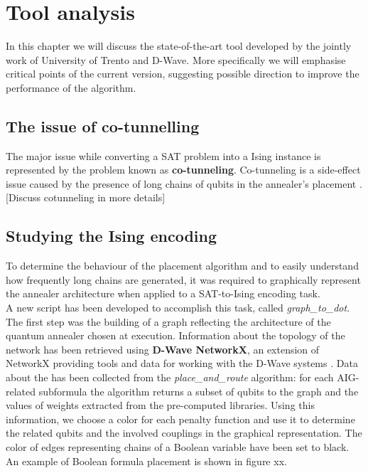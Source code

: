 \chapter{Tool analysis}
\label{cha:analysis}

In this chapter we will discuss the state-of-the-art tool developed by the jointly work of University of Trento and D-Wave. More specifically we will emphasise critical points of the current version, suggesting possible direction to improve the performance of the algorithm.

\section{The issue of co-tunnelling}

The major issue while converting a SAT problem into a Ising instance is represented by the problem known as \textbf{co-tunneling}. Co-tunneling is a side-effect issue caused by the presence of long chains of qubits in the annealer's placement \cite{cotunneling}. [Discuss cotunneling in more details]

\section{Studying the Ising encoding}

To determine the behaviour of the placement algorithm and to easily understand how frequently long chains are generated, it was required to graphically represent the annealer architecture when applied to a SAT-to-Ising encoding task. \\
A new script has been developed to accomplish this task, called \textit{graph\_to\_dot}. The first step was the building of a graph reflecting the architecture of the quantum annealer chosen at execution. Information about the topology of the network has been retrieved using \textbf{D-Wave NetworkX}, an extension of NetworkX providing tools and data for working with the D-Wave systems \cite{dwavenetx}. Data about the has been collected from the \textit{place\_and\_route} algorithm: for each AIG-related subformula the algorithm returns a subset of qubits to the graph and the values of weights extracted from the pre-computed libraries. Using this information, we choose a color for each penalty function and use it to determine the related qubits and the involved couplings in the graphical representation. The color of edges representing chains of a Boolean variable have been set to black. 
An example of Boolean formula placement is shown in figure xx.

